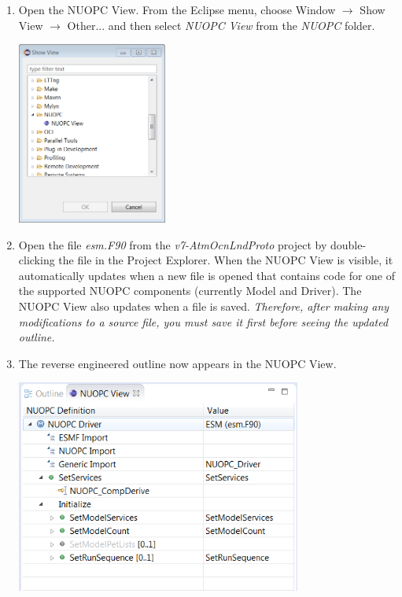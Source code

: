 \documentclass[oneside,11pt]{memoir}
\begin{document}
\begin{enumerate}
\item Open the NUOPC View.  From the Eclipse menu, choose Window $\rightarrow$ Show View $\rightarrow$ Other... and then select \emph{NUOPC View} from the \emph{NUOPC} folder.

\vspace{24pt}
\parbox{\linewidth}{\centering
  \includegraphics[height=6cm]{figs/reveng_fig1.png}
}
\vspace{24pt}

\item Open the file \emph{esm.F90} from the \emph{v7-AtmOcnLndProto} project by double-clicking the file in the Project Explorer.  When the NUOPC View is visible, it automatically updates when a new file is opened that contains code for one of the supported NUOPC components (currently Model and Driver).  The NUOPC View also updates when a file is saved.  \emph{Therefore, after making any modifications to a source file, you must save it first before seeing the updated outline.}

\item The reverse engineered outline now appears in the NUOPC View.  

\vspace{24pt}
\parbox{\linewidth}{\centering
  \includegraphics[height=7cm]{figs/reveng_fig3.png}
}
\vspace{24pt}


\end{enumerate}
\end{document}
